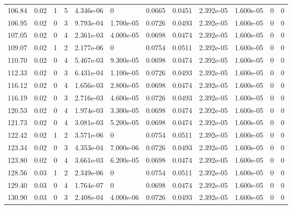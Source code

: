 \documentclass[preview]{standalone}
\begin{document}
{{{\begin{tabular}{L{1.2cm}C{1.2cm} C{0.3cm}C{0.5cm} C{1.4cm}C{1.4cm} C{1.4cm}C{1.4cm} C{1.6cm}C{1.6cm} C{1.6cm}C{1.6cm}}
  106.84  &  0.02  & 1     &  5 &  4.346e-06  & 0  &  0.0665&   0.0451& 2.392e-05 & 1.600e-05   &  0 & 0  \\ 
  106.95  &  0.02  & 0     &  3 &  9.793e-04  & 1.700e-05  &  0.0726&   0.0493& 2.392e-05 & 1.600e-05   &  0 & 0  \\ 
  107.05  &  0.02  & 0     &  4 &  2.361e-03  & 4.000e-05  &  0.0698&   0.0474& 2.392e-05 & 1.600e-05   &  0 & 0  \\ 
  109.07  &  0.02  & 1     &  2 &  2.177e-06  & 0  &  0.0754&   0.0511& 2.392e-05 & 1.600e-05   &  0 & 0  \\ 
  110.70  &  0.02  & 0     &  4 &  5.467e-03  & 9.300e-05  &  0.0698&   0.0474& 2.392e-05 & 1.600e-05   &  0 & 0  \\ 
  112.33  &  0.02  & 0     &  3 &  6.431e-04  & 1.100e-05  &  0.0726&   0.0493& 2.392e-05 & 1.600e-05   &  0 & 0  \\ 
  116.12  &  0.02  & 0     &  4 &  1.656e-03  & 2.800e-05  &  0.0698&   0.0474& 2.392e-05 & 1.600e-05   &  0 & 0  \\ 
  116.19  &  0.02  & 0     &  3 &  2.716e-03  & 4.600e-05  &  0.0726&   0.0493& 2.392e-05 & 1.600e-05   &  0 & 0  \\ 
  120.53  &  0.02  & 0     &  4 &  1.974e-03  & 3.300e-05  &  0.0698&   0.0474& 2.392e-05 & 1.600e-05   &  0 & 0  \\ 
  121.73  &  0.02  & 0     &  4 &  3.081e-03  & 5.200e-05  &  0.0698&   0.0474& 2.392e-05 & 1.600e-05   &  0 & 0  \\ 
  122.42  &  0.02  & 1     &  2 &  3.571e-06  & 0  &  0.0754&   0.0511& 2.392e-05 & 1.600e-05   &  0 & 0  \\ 
  123.34  &  0.02  & 0     &  3 &  4.353e-04  & 7.000e-06  &  0.0726&   0.0493& 2.392e-05 & 1.600e-05   &  0 & 0  \\ 
  123.80  &  0.02  & 0     &  4 &  3.661e-03  & 6.200e-05  &  0.0698&   0.0474& 2.392e-05 & 1.600e-05   &  0 & 0  \\ 
  128.56  &  0.03  & 1     &  2 &  2.349e-06  & 0  &  0.0754&   0.0511& 2.392e-05 & 1.600e-05   &  0 & 0  \\ 
  129.40  &  0.03  & 0     &  4 &  1.764e-07  & 0  &  0.0698&   0.0474& 2.392e-05 & 1.600e-05   &  0 & 0  \\ 
  130.90  &  0.03  & 0     &  3 &  2.408e-04  & 4.000e-06  &  0.0726&   0.0493& 2.392e-05 & 1.600e-05   &  0 & 0  \\ 
\hline 
\end{tabular} 

}}}
\end{document}
